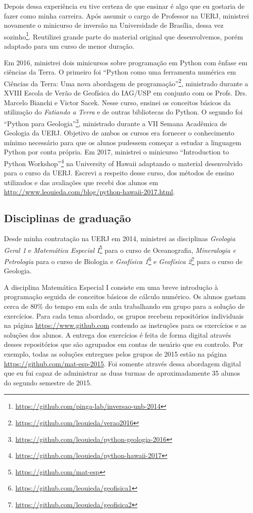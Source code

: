 Depois dessa experiência eu tive certeza de que ensinar é algo que eu gostaria
de fazer como minha carreira.
Após assumir o cargo de Professor na UERJ, ministrei novamente o minicurso de
inversão na Universidade de Brasília, dessa vez
sozinho\footnote{\url{https://github.com/pinga-lab/inversao-unb-2014}}.
Reutilizei grande parte do material original que desenvolvemos, porém adaptado
para um curso de menor duração.

Em 2016, ministrei dois minicursos sobre programação em Python com ênfase em
ciências da Terra.
O primeiro foi ``Python como uma ferramenta numérica em Ciências da
Terra: Uma nova abordagem de
programação''\footnote{\url{https://github.com/leouieda/verao2016}}, ministrado
durante
a XVIII Escola de Verão de Geofísica do IAG/USP em conjunto com os Profs. Drs.
Marcelo Bianchi e Victor Sacek.
Nesse curso, ensinei os conceitos básicos da utilização do \textit{Fatiando a
Terra} e de outras bibliotecas do Python.
O segundo foi ``Python para
Geologia''\footnote{\url{https://github.com/leouieda/python-geologia-2016}},
ministrado durante a
VII Semana Acadêmica de Geologia da UERJ.
Objetivo de ambos os cursos era fornecer o conhecimento mínimo necessário para
que os alunos pudessem começar a estudar a linguagem Python por conta própria.
Em 2017, ministrei o minicurso ``Introduction to Python
Workshop''\footnote{\url{https://github.com/leouieda/python-hawaii-2017}} na
University of Hawaii adaptando o material desenvolvido para o curso da UERJ.
Escrevi a respeito desse curso, dos métodos de ensino utilizados e das
avaliações que recebi dos alunos em
\url{http://www.leouieda.com/blog/python-hawaii-2017.html}.


\subsection{Disciplinas de graduação}

Desde minha contratação na UERJ em 2014, ministrei as disciplinas
\textit{Geologia Geral 1} e \textit{Matemática Especial
I}\footnote{\url{https://github.com/mat-esp}} para o curso de
Oceanografia, \textit{Mineralogia e Petrologia} para o curso de Biologia e
\textit{Geofísica 1}\footnote{\url{https://github.com/leouieda/geofisica1}} e
\textit{Geofísica 2}\footnote{\url{https://github.com/leouieda/geofisica2}}
para o curso de Geologia.

A disciplina Matemática Especial I consiste em uma breve introdução à
programação seguida de conceitos básicos de cálculo numérico.
Os alunos gastam cerca de $80\%$ do tempo em sala de aula trabalhando em grupo
para a solução de exercícios.
Para cada tema abordado, os grupos recebem repositórios individuais na página
\url{https://www.github.com} contendo as instruções para os exercícios e as
soluções dos alunos.
A entrega dos exercícios é feita de forma digital através desses repositórios
que são agrupados em contas de usuário que eu controlo.
Por exemplo, todas as soluções entregues pelos grupos de 2015 estão na página
\url{https://github.com/mat-esp-2015}.
Foi somente através dessa abordagem digital que eu fui capaz de administrar as
duas turmas de aproximadamente 35 alunos do segundo semestre de 2015.


